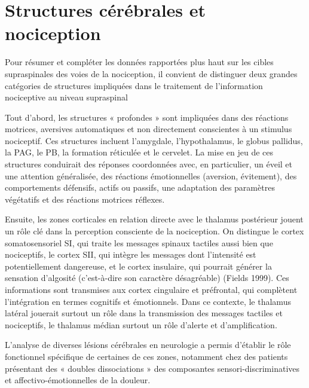 \documentclass[a4paper,12pt,twoside]{report}
\begin{document}
\clearpage

\section{Structures cérébrales et nociception}

Pour résumer et compléter les données rapportées plus haut sur les cibles supraspinales des voies de la nociception, il convient de distinguer deux grandes catégories de structures impliquées dans le traitement de l’information nociceptive au niveau supraspinal

Tout d’abord, les structures « profondes » sont impliquées dans des réactions motrices, aversives automatiques et non directement conscientes à un stimulus nociceptif. Ces structures incluent l'amygdale, l'hypothalamus, le globus pallidus, la PAG, le PB, la formation réticulée et le cervelet. La mise en jeu de ces structures conduirait des réponses coordonnées avec, en particulier, un éveil et une attention généralisée, des réactions émotionnelles (aversion, évitement), des comportements défensifs, actifs ou passifs, une adaptation des paramètres végétatifs et des réactions motrices réflexes.

Ensuite, les zones corticales en relation directe avec le thalamus postérieur jouent un rôle clé dans la perception consciente de la nociception. On distingue le cortex somatosensoriel SI, qui traite les messages spinaux tactiles aussi bien que nociceptifs, le cortex SII, qui intègre les messages dont l'intensité est potentiellement dangereuse, et le cortex insulaire, qui pourrait générer la sensation d'algosité (c'est-à-dire son caractère désagréable) (Fields 1999). Ces informations sont transmises aux cortex cingulaire et préfrontal, qui complètent l’intégration en termes cognitifs et émotionnels. Dans ce contexte, le thalamus latéral jouerait surtout un rôle dans la transmission des messages tactiles et nociceptifs, le thalamus médian surtout un rôle d'alerte et d'amplification.

L’analyse de diverses lésions cérébrales en neurologie a permis d’établir le rôle fonctionnel spécifique de certaines de ces zones, notamment chez des patients présentant des « doubles dissociations » des composantes sensori-discriminatives et affectivo-émotionnelles de la douleur.
\end{document}
